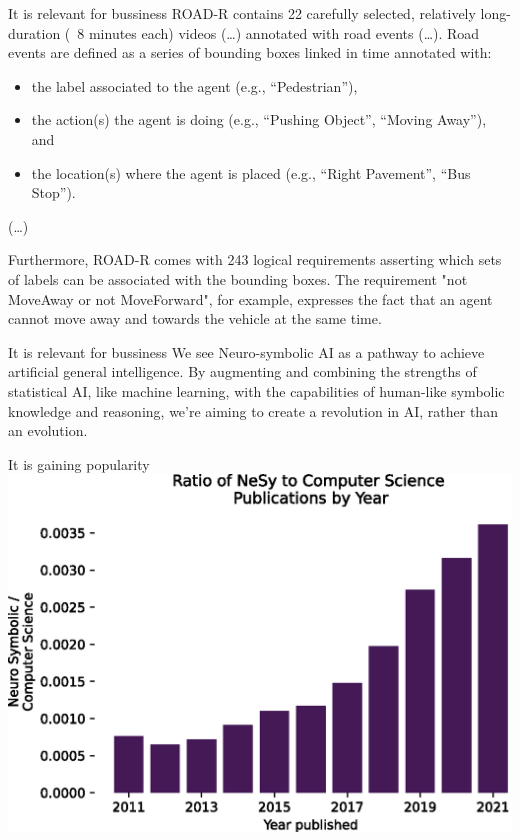 \documentclass{lecture}
\begin{document}
\begin{frame}{It is relevant for bussiness}
    ROAD-R contains 22 carefully selected, relatively long-duration (~8 minutes each) videos (\ldots) annotated with road events (\ldots). Road events are defined as a series of bounding boxes linked in time annotated with:

    \begin{itemize}
        \item the label associated to the agent (e.g., “Pedestrian”),
        \item the action(s) the agent is doing (e.g., “Pushing Object”, “Moving Away”), and
        \item the location(s) where the agent is placed (e.g., “Right Pavement”, “Bus Stop”).
    \end{itemize}
    (\ldots)

Furthermore, ROAD-R comes with \alert{243 logical requirements asserting which sets of labels can be associated with the bounding boxes}. The requirement "not MoveAway or not MoveForward", for example, expresses the fact that an agent cannot move away and towards the vehicle at the same time. 
\end{frame}

\begin{frame}{It is relevant for bussiness}
    We see Neuro-symbolic AI as a pathway to achieve artificial general intelligence. By augmenting and combining the strengths of statistical AI, like machine learning, with the capabilities of human-like symbolic knowledge and reasoning, we're aiming to create a revolution in AI, rather than an evolution.

\end{frame}


\begin{frame}{It is gaining popularity}
    \centering
    \includegraphics[width=.8\textwidth]{SW223228/allNesyByYear.eps}
\end{frame}
\end{document}
